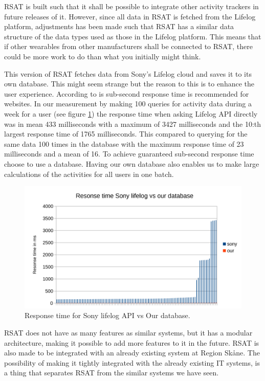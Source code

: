 \documentclass{cslthse-msc}
\begin{document}
RSAT is built such that it shall be possible to integrate other activity trackers in future releases of it. However, since all data in RSAT is fetched from the Lifelog platform, adjustments has been made such that RSAT has a similar data structure of the data types used as those in the Lifelog platform. This means that if other wearables from other manufacturers shall be connected to RSAT, there could be more work to do than what you initially might think. 

This version of RSAT fetches data from Sony’s Lifelog cloud and saves it to its own database. This might seem strange but the reason to this is to enhance the user experience. According to \cite{nielsen1999user} is sub-second response time is recommended for websites. In our measurement by making 100 queries for activity data during a week for a user (see figure \ref{fig:response}) the response time when asking Lifelog API directly was in mean 433 milliseconds with a maximum of 3427 milliseconds and the 10:th largest response time of 1765 milliseconds. This compared to querying for the same data 100 times in the database with the maximum response time of 23 milliseconds and a mean of 16. To achieve guaranteed sub-second response time choose to use a database. Having our own database also enables us to make large calculations of the activities for all users in one batch.

\begin{figure}[!hbt]
\centering
\includegraphics[scale=0.9]{resonsetime.pdf} 
\caption{Response time for Sony lifelog API vs Our database.}
\label{fig:response}
\end{figure}


RSAT does not have as many features as similar systems, but it has a modular architecture, making it possible to add more features to it in the future. RSAT is also made to be integrated with an already existing system at Region Skåne. The possibility of making it tightly integrated with the already existing IT systems, is a thing that separates RSAT from the similar systems we have seen. 
\end{document}
